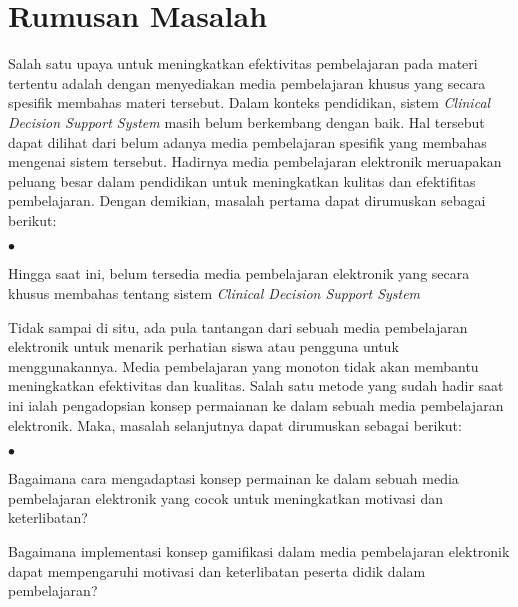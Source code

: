 
\newpage
\section{Rumusan Masalah}
Salah satu upaya untuk meningkatkan efektivitas pembelajaran pada materi tertentu adalah dengan menyediakan media pembelajaran khusus yang secara spesifik membahas materi tersebut.
Dalam konteks pendidikan, sistem \textit{Clinical Decision Support System} masih belum berkembang dengan baik.
Hal tersebut dapat dilihat dari belum adanya media pembelajaran spesifik yang membahas mengenai sistem tersebut.
Hadirnya media pembelajaran elektronik meruapakan peluang besar dalam pendidikan untuk meningkatkan kulitas dan efektifitas pembelajaran.
Dengan demikian, masalah pertama dapat dirumuskan sebagai berikut:
\begin{list}{\small$\bullet$}{}
	\item Hingga saat ini, belum tersedia media pembelajaran elektronik yang secara khusus membahas tentang sistem \textit{Clinical Decision Support System}
\end{list}

Tidak sampai di situ, ada pula tantangan dari sebuah media pembelajaran elektronik untuk menarik perhatian siswa atau pengguna untuk menggunakannya.
Media pembelajaran yang monoton tidak akan membantu meningkatkan efektivitas dan kualitas. Salah satu metode yang sudah hadir saat ini ialah
pengadopsian konsep permaianan ke dalam sebuah media pembelajaran elektronik. Maka, masalah selanjutnya dapat dirumuskan sebagai berikut:
\begin{list}{\small$\bullet$}{}
	\item Bagaimana cara mengadaptasi konsep permainan ke dalam sebuah media pembelajaran elektronik yang cocok untuk meningkatkan motivasi dan keterlibatan?
	\item Bagaimana implementasi konsep gamifikasi dalam media pembelajaran elektronik dapat mempengaruhi motivasi dan keterlibatan peserta didik dalam pembelajaran?
\end{list}


